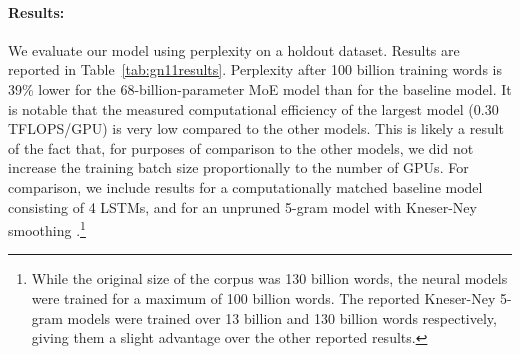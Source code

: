 \documentclass{article} %
\begin{document}
\begin{table}[h!]
\caption{ Model comparison on 100 Billion Word Google News Dataset}
\label{tab:gn11results}
\begin{center}
\setlength\tabcolsep{3pt}
\end{center}
\end{table}

\paragraph{Results:} We evaluate our model using perplexity on a holdout dataset.   Results are reported in Table~\ref{tab:gn11results}.  Perplexity after 100 billion training words is 39\% lower for the 68-billion-parameter MoE model than for the baseline model.   It is notable that the measured computational efficiency of the largest model (0.30 TFLOPS/GPU) is very low compared to the other models.  This is likely a result of the fact that, for purposes of comparison to the other models, we did not increase the training batch size proportionally to the number of GPUs.  For comparison, we include results for a computationally matched baseline model consisting of 4 LSTMs, and for an unpruned 5-gram model with Kneser-Ney smoothing \citep{KneserNey95}.\footnote{While the original size of the corpus was 130 billion words, the neural models were trained for a maximum of 100 billion words.  The reported Kneser-Ney 5-gram models were trained over 13 billion and 130 billion words respectively, giving them a slight advantage over the other reported results.}
\end{document}
